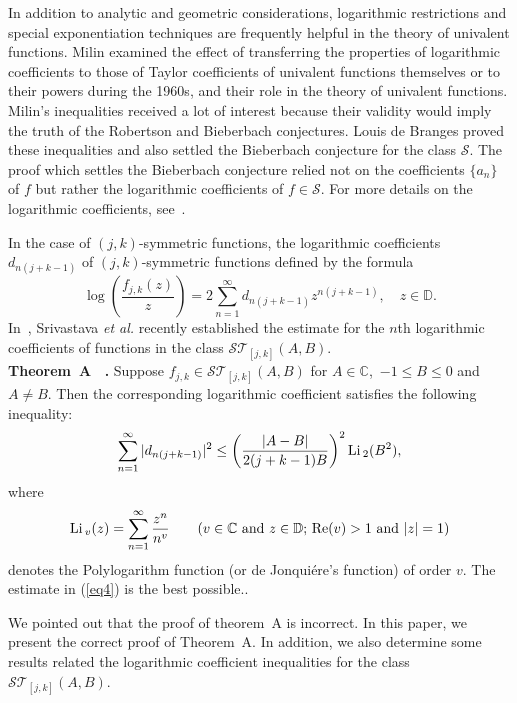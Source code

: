 \documentclass[12pt]{amsart}
\numberwithin{equation}{section}
\theoremstyle{definition}
\numberwithin{equation}{section}
\newcommand{\T}{{\mathcal T}}
\newcommand{\es}{{\mathcal S}}
\newcommand{\IC}{{\mathbb C}}
\newcommand{\D}{{\mathbb D}}
\begin{document}
In addition to analytic and geometric considerations, logarithmic restrictions and special exponentiation techniques are frequently helpful in the theory of univalent functions. Milin examined the effect of transferring the properties of logarithmic coefficients to those of Taylor coefficients of univalent functions themselves or to their powers during the 1960s, and their role in the theory of univalent functions. Milin's inequalities received a lot of interest because their validity would imply the truth of the Robertson and Bieberbach conjectures. 
Louis de Branges proved these inequalities and also settled the Bieberbach conjecture for the class $\es.$ The proof which settles the
Bieberbach conjecture relied not on the coefficients $\{a_n\}$ of $f$ but rather the logarithmic coefficients of $f\in\es$. For more details on the logarithmic coefficients, see~\cite{PSW1,PSW2}.

In the case of  ${(j,k)}$-symmetric functions, the logarithmic coefficients $d_{n(j+k-1)}$ of  ${(j,k)}$-symmetric functions defined by the formula 
\begin{equation}\label{eq3}
\log\left( \frac{f_{j,k}(z)}{z}\right) =2\sum_{n=1}^{\infty} d_{n(j+k-1)} z^{n(j+k-1)}, \quad z\in \D.
\end{equation}
In~\cite{HG22}, Srivastava {\it et al.} recently established the estimate for the $n$th logarithmic coefficients of functions in the class $\es \T_{[j,k]}(A,B)$. \\

\noindent
{\bf Theorem~A ~\cite[Theorem~3]{HG22}.} 
Suppose $f_{j,k} \in \es \T_{[j,k]}(A,B)$ for $A\in\IC $,\,  $-1\le B\le 0$ and $A\neq B$. Then the corresponding logarithmic coefficient satisfies the following inequality:
\begin{equation}\label{eq4}
\sum_{n=1}^{\infty}| d_{n(j+k-1)}|^{2} \leq \left(\frac{|A-B|}{2(j+k-1)B}\right)^2 {\rm Li\,}_{2}(B^2),
\end{equation}
where 
$${\rm Li\,}_{v}(z)=\sum_{n=1}^{\infty}\frac{z^n}{n^v} \quad \quad (v\in\IC \mbox{ and } z\in\D;\, {\rm Re}(v)>1 \mbox{ and } |z|=1)
$$ denotes the Polylogarithm function (or de Jonqui\'{e}re's function) of order $v$. The estimate in (\ref{eq4}) is the best possible..

We pointed out that the proof of theorem~A is incorrect. %
In this paper, we present the correct proof of Theorem~A. 
In addition, we also determine some results related the logarithmic coefficient inequalities for the class $\mathcal{ST}_{[j,k]}(A,B)$.
\end{document}
